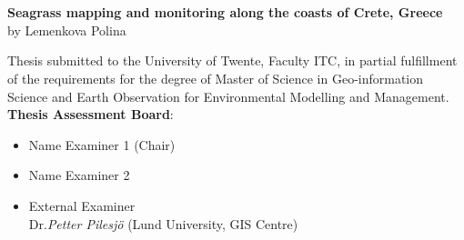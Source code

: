 \documentclass[11pt]{article}
\begin{document}
\begin{figure}[H]
	\centering
	\hspace{3mm}
	\hspace{3mm}
	\hspace{3mm}
\end{figure}

\pagebreak


\section*{}
\begin{center}
\textbf{Seagrass mapping and monitoring along the coasts of Crete, Greece}\\
\vspace{1em}
by Lemenkova Polina
\end{center}

Thesis submitted to the University of Twente, Faculty ITC, in partial fulfillment of the requirements
for the degree of Master of Science in Geo-information Science and Earth Observation for
Environmental Modelling and Management.\\

\textbf{Thesis Assessment Board}:
\begin{itemize}
	\item Name Examiner 1 (Chair)\dotfill
	\item Name Examiner 2\dotfill
	\item External Examiner \dotfill \\ \hfill{Dr.{\textit{Petter Pilesj\"o}} (Lund University, GIS Centre)}
\end{itemize}
\end{document}
